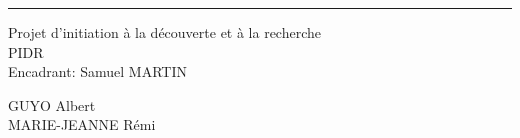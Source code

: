 \documentclass{scrreprt}
\date{}
\begin{document}
\begin{flushright}
    \rule{16cm}{5pt}\vskip1cm
    \begin{bfseries}
        \Huge{Projet d'initiation à la découverte et à la recherche \\ PIDR}\\
        \vspace{1.9cm}
        \LARGE{Encadrant: Samuel MARTIN}\\
       \vspace{10.9cm}
	\begin{center}
		GUYO Albert\\
		MARIE-JEANNE Rémi\\
	\end{center}
        \vspace{1.9cm}
    \end{bfseries}
\end{flushright}
\end{document}
